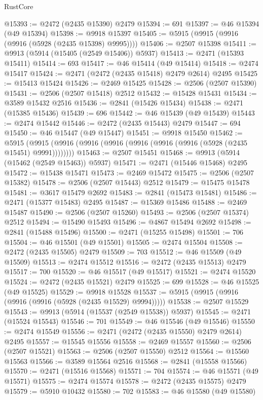 \begin{lexlean}{RustCore}
\begin{coremodule}
@15393 := @2472 (@2435 @15390) @2479
@15394 := 691
@15397 := @46 @15394 (@49 @15394)
@15398 := @9918 @15397
@15405 := @5915 (@9915 (@9916 (@9916 (@5928 (@2435 @15398) @9995))))
@15406 := @2507 @15398
@15411 := @9913 (@5914 (@15405 (@2549 @15406)) @5937)
@15413 := @2471 (@15393 @15411)
@15414 := 693
@15417 := @46 @15414 (@49 @15414)
@15418 := @2474 @15417
@15424 := @2471 (@2472 (@2435 @15418) @2479 @2614) @2495
@15425 := @15413 @15424
@15426 := @2469 @15425
@15428 := @2506 (@2507 @15390)
@15431 := @2506 (@2507 @15418) @2512
@15432 := @15428 @15431
@15434 := @3589 @15432 @2516
@15436 := @2841 (@15426 @15434)
@15438 := @2471 (@15385 @15436)
@15439 := 696
@15442 := @46 @15439 (@49 @15439)
@15443 := @2474 @15442
@15446 := @2472 (@2435 @15443) @2479
@15447 := 694
@15450 := @46 @15447 (@49 @15447)
@15451 := @9918 @15450
@15462 := @5915 (@9915 (@9916 (@9916 (@9916 (@9916 (@9916 (@9916 (@5928 (@2435 @15451) @9991))))))))
@15463 := @2507 @15451
@15468 := @9913 (@5914 (@15462 (@2549 @15463)) @5937)
@15471 := @2471 (@15446 @15468) @2495
@15472 := @15438 @15471
@15473 := @2469 @15472
@15475 := @2506 (@2507 @15382)
@15478 := @2506 (@2507 @15443) @2512
@15479 := @15475 @15478
@15481 := @3617 @15479 @2692
@15483 := @2841 (@15473 @15481)
@15486 := @2471 (@15377 @15483) @2495
@15487 := @15369 @15486
@15488 := @2469 @15487
@15490 := @2506 (@2507 @15260)
@15493 := @2506 (@2507 @15374) @2512
@15494 := @15490 @15493
@15496 := @4867 @15494 @2692
@15498 := @2841 (@15488 @15496)
@15500 := @2471 (@15255 @15498)
@15501 := 706
@15504 := @46 @15501 (@49 @15501)
@15505 := @2474 @15504
@15508 := @2472 (@2435 @15505) @2479
@15509 := 703
@15512 := @46 @15509 (@49 @15509)
@15513 := @2474 @15512
@15516 := @2472 (@2435 @15513) @2479
@15517 := 700
@15520 := @46 @15517 (@49 @15517)
@15521 := @2474 @15520
@15524 := @2472 (@2435 @15521) @2479
@15525 := 699
@15528 := @46 @15525 (@49 @15525)
@15529 := @9918 @15528
@15537 := @5915 (@9915 (@9916 (@9916 (@9916 (@5928 (@2435 @15529) @9994)))))
@15538 := @2507 @15529
@15543 := @9913 (@5914 (@15537 (@2549 @15538)) @5937)
@15545 := @2471 (@15524 @15543)
@15546 := 701
@15549 := @46 @15546 (@49 @15546)
@15550 := @2474 @15549
@15556 := @2471 (@2472 (@2435 @15550) @2479 @2614) @2495
@15557 := @15545 @15556
@15558 := @2469 @15557
@15560 := @2506 (@2507 @15521)
@15563 := @2506 (@2507 @15550) @2512
@15564 := @15560 @15563
@15566 := @3589 @15564 @2516
@15568 := @2841 (@15558 @15566)
@15570 := @2471 (@15516 @15568)
@15571 := 704
@15574 := @46 @15571 (@49 @15571)
@15575 := @2474 @15574
@15578 := @2472 (@2435 @15575) @2479
@15579 := @5910 @10432
@15580 := 702
@15583 := @46 @15580 (@49 @15580)

\end{coremodule}
\end{lexlean}
